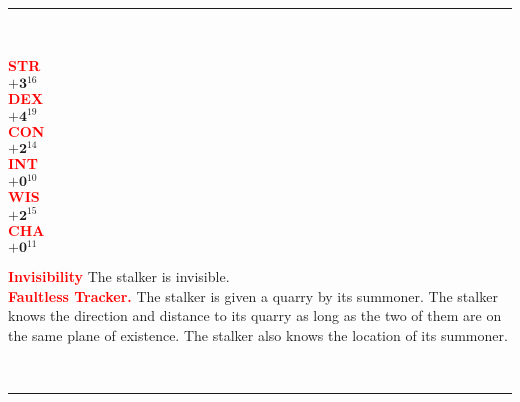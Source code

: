 \documentclass{article}
\begin{document}
\begin{adjustbox}{minipage=0.45\textwidth, margin=\fboxsep, bgimage=../images/texture2.pdf}
{\begin{minipage}[t][10.5in][t]{0.9\textwidth}
\begin{minipage}[t]{0.7\textwidth}
        \end{minipage}
        \vspace{0.025in}\\
        \rule{\textwidth}{1pt}\\
        \vspace{0.025in}
        \begin{minipage}[t]{0.2\textwidth}
            {\large
            \textcolor{red}{\textbf{STR}}\\[0.1em]
            $\mathbf{+3}$\quad$^{16}$ \\[0.1em]
            \textcolor{red}{\textbf{DEX}}\\[0.1em]
            $\mathbf{+4}$\quad$^{19}$ \\[0.1em]
            \textcolor{red}{\textbf{CON}}\\[0.1em]
            $\mathbf{+2}$\quad$^{14}$ \\[0.1em]
            \textcolor{red}{\textbf{INT}}\\[0.1em]
            $\mathbf{+0}$\quad$^{10}$ \\[0.1em]
            \textcolor{red}{\textbf{WIS}}\\[0.1em]
            $\mathbf{+2}$\quad$^{15}$ \\[0.1em]
            \textcolor{red}{\textbf{CHA}}\\[0.1em]
            $\mathbf{+0}$\quad$^{11}$ \\[0.1em]
            }
        \end{minipage}
        \hspace{-0.1in}
        \vline
        \hspace{0.1in}
        \begin{minipage}[t]{0.7\textwidth}
            \textcolor{red}{\textbf{Invisibility}} The stalker is invisible. \\[0.2em]
            \textcolor{red}{\textbf{Faultless Tracker.}} The stalker is given a quarry by its summoner. The stalker knows the direction and distance to its quarry as long as the two of them are on the same plane of existence. The stalker also knows the location of its summoner.
        \end{minipage}
        \vspace{0.025in}\\
        \rule{\textwidth}{1pt}\\
        \vspace{-0.08in}
        \begin{flushleft}

\end{flushleft}
\end{minipage}}
\end{adjustbox}
\end{document}
